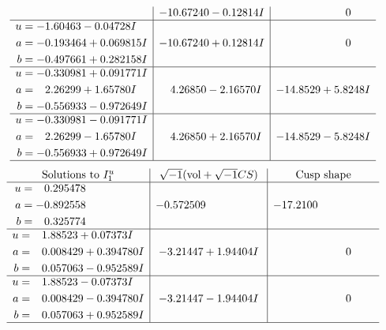 \documentclass[1p]{elsarticle_modified}
\theoremstyle{definition}
\newcommand{\I}{\sqrt{-1}}
\begin{document}
$$\begin{array}{c|c|c}
 & -10.67240 - 0.12814 I & \phantom{-0.000000 } 0 \\ \hline\begin{aligned}
u &= -1.60463 - 0.04728 I \\
a &= -0.193464 + 0.069815 I \\
b &= -0.497661 + 0.282158 I\end{aligned}
 & -10.67240 + 0.12814 I & \phantom{-0.000000 } 0 \\ \hline\begin{aligned}
u &= -0.330981 + 0.091771 I \\
a &= \phantom{-}2.26299 + 1.65780 I \\
b &= -0.556933 - 0.972649 I\end{aligned}
 & \phantom{-}4.26850 - 2.16570 I & -14.8529 + 5.8248 I \\ \hline\begin{aligned}
u &= -0.330981 - 0.091771 I \\
a &= \phantom{-}2.26299 - 1.65780 I \\
b &= -0.556933 + 0.972649 I\end{aligned}
 & \phantom{-}4.26850 + 2.16570 I & -14.8529 - 5.8248 I\\
 \hline 
 \end{array}$$\newpage$$\begin{array}{c|c|c}  
\text{Solutions to }I^u_{1}& \I (\text{vol} + \sqrt{-1}CS) & \text{Cusp shape}\\
 \hline 
\begin{aligned}
u &= \phantom{-}0.295478\phantom{ +0.000000I} \\
a &= -0.892558\phantom{ +0.000000I} \\
b &= \phantom{-}0.325774\phantom{ +0.000000I}\end{aligned}
 & -0.572509\phantom{ +0.000000I} & -17.2100\phantom{ +0.000000I} \\ \hline\begin{aligned}
u &= \phantom{-}1.88523 + 0.07373 I \\
a &= \phantom{-}0.008429 + 0.394780 I \\
b &= \phantom{-}0.057063 - 0.952589 I\end{aligned}
 & -3.21447 + 1.94404 I & \phantom{-0.000000 } 0 \\ \hline\begin{aligned}
u &= \phantom{-}1.88523 - 0.07373 I \\
a &= \phantom{-}0.008429 - 0.394780 I \\
b &= \phantom{-}0.057063 + 0.952589 I\end{aligned}
 & -3.21447 - 1.94404 I & \phantom{-0.000000 } 0\\
 \hline 
 \end{array}$$\newpage\newpage\renewcommand{\arraystretch}{1}
\end{document}
